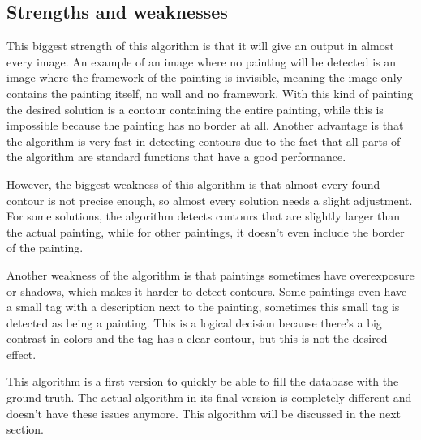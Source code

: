 \subsection{Strengths and weaknesses}

This biggest strength of this algorithm is that it will give an output in almost every image. An example of an image where no painting will be detected is an image where the framework of the painting is invisible, meaning the image only contains the painting itself, no wall and no framework. With this kind of painting the desired solution is a contour containing the entire painting, while this is impossible because the painting has no border at all. Another advantage is that the algorithm is very fast in detecting contours due to the fact that all parts of the algorithm are standard functions that have a good performance.

However, the biggest weakness of this algorithm is that almost every found contour is not precise enough, so almost every solution needs a slight adjustment. For some solutions, the algorithm detects contours that are slightly larger than the actual painting, while for other paintings, it doesn't even include the border of the painting.

Another weakness of the algorithm is that paintings sometimes have overexposure or shadows, which makes it harder to detect contours. Some paintings even have a small tag with a description next to the painting, sometimes this small tag is detected as being a painting. This is a logical decision because there's a big contrast in colors and the tag has a clear contour, but this is not the desired effect.

This algorithm is a first version to quickly be able to fill the database with the ground truth. The actual algorithm in its final version is completely different and doesn't have these issues anymore. This algorithm will be discussed in the next section.

